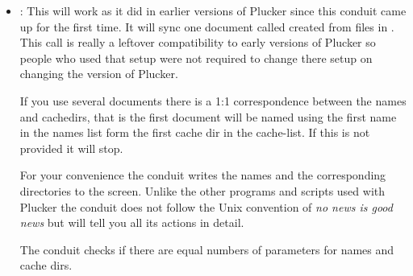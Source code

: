 \begin{itemize}

  \item {}: This will work as it did in earlier versions
  of Plucker since this conduit came up for the first time. It will
  sync one document called  created from files in
  . This call is really a leftover compatibility to 
  early versions of Plucker so people who used that setup were not 
  required to change there setup on changing the version of Plucker.


  \note{} If you use several documents there is a 1:1 correspondence
  between the names and cachedirs, that is the first document will be
  named using the first name in the names list form the first cache dir
  in the cache-list. If this is not provided it will stop.

  For your convenience the conduit writes the names and the
  corresponding directories to the screen. Unlike the other programs
  and scripts used with Plucker the conduit does not follow the
  Unix convention of \emph{no news is good news} but will tell you
  all its actions in detail. 

  \note{} The conduit checks if there are equal numbers of parameters
  for names and cache dirs.



\end{itemize}
